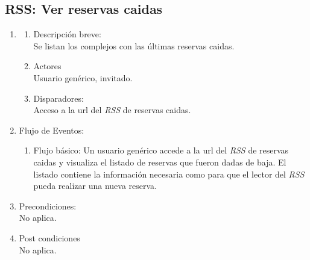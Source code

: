 \documentclass[a4paper,11pt]{article}
\begin{document}
\subsection{RSS: Ver reservas caidas}
\begin{enumerate}

    \item
        \begin{enumerate}
            \item Descripción breve: \\
                Se listan los complejos con las últimas reservas caidas.
            \item Actores \\
                Usuario genérico, invitado.

            \item Disparadores: \\
                Acceso a la url del \emph{RSS} de reservas caidas.

        \end{enumerate}

    \item Flujo de Eventos:

        \begin{enumerate}
            \item Flujo básico:
                Un usuario genérico accede a la url del \emph{RSS}  de reservas caidas
                y visualiza el listado de reservas que fueron dadas de baja. El listado
                contiene la información necesaria como para que el lector del \emph{RSS}
                pueda realizar una nueva reserva.
        \end{enumerate}

    \item Precondiciones: \\
        No aplica.

    \item Post condiciones \\
        No aplica.

\end{enumerate}

\end{document}
